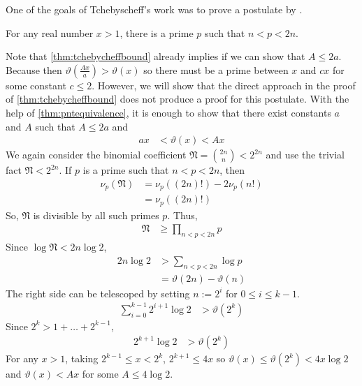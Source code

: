 \documentclass[elemannt.tex]{subfile}
\begin{document}
	One of the goals of Tchebyscheff's work was to prove a postulate by \textcite{bertrand_1845}.
		\begin{conjecture}\label{con:bertrand}
			For any real number $x>1$, there is a prime $p$ such that $n<p<2n$.
		\end{conjecture}
	Note that \autoref{thm:tchebycheffbound} already implies  if we can show that $A\leq 2a$. Because then $\vartheta\left(\frac{Ax}{a}\right)>\vartheta(x)$ so there must be a prime between $x$ and $cx$ for some constant $c\leq 2$. However, we will show that the direct approach in the proof of \autoref{thm:tchebycheffbound} does not produce a proof for this postulate.
			With the help of \autoref{thm:pntequivalence}, it is enough to show that there exist constants $a$ and $A$ such that $A\leq 2a$ and
				\begin{align*}
					ax
					& < \vartheta(x) < Ax
				\end{align*}
			We again consider the binomial coefficient $\mathfrak{N}=\binom{2n}{n}<2^{2n}$ and use the trivial fact $\mathfrak{N}<2^{2n}$. If $p$ is a prime such that $n<p<2n$, then
				\begin{align*}
					\nu_{p}(\mathfrak{N})
						& = \nu_{p}((2n)!)-2\nu_{p}(n!)\\
						& = \nu_{p}((2n)!)
				\end{align*}
			So, $\mathfrak{N}$ is divisible by all such primes $p$. Thus,
				\begin{align*}
					\mathfrak{N}
						& \geq \prod_{n<p<2n}p
				\end{align*}
			Since $\log{\mathfrak{N}}<2n\log{2}$,
				\begin{align*}
					2n\log{2}
						& > \sum_{n<p<2n}\log{p}\\
						& = \vartheta(2n)-\vartheta(n)
				\end{align*}
			The right side can be telescoped by setting $n:=2^{i}$ for $0\leq i\leq  k-1$.
				\begin{align*}
					\sum_{i=0}^{k-1}2^{i+1}\log{2}
						& > \vartheta(2^{k})
				\end{align*}
			Since $2^{k}>1+\ldots+2^{k-1}$,
				\begin{align*}
					2^{k+1}\log{2}
						& > \vartheta(2^{k})
				\end{align*}
			For any $x>1$, taking $2^{k-1}\leq x<2^{k}$, $2^{k+1}\leq 4x$ so $\vartheta(x)\leq\vartheta(2^{k})<4x\log{2}$ and $\vartheta(x)<Ax$ for some $A\leq 4\log{2}$.
\end{document}
